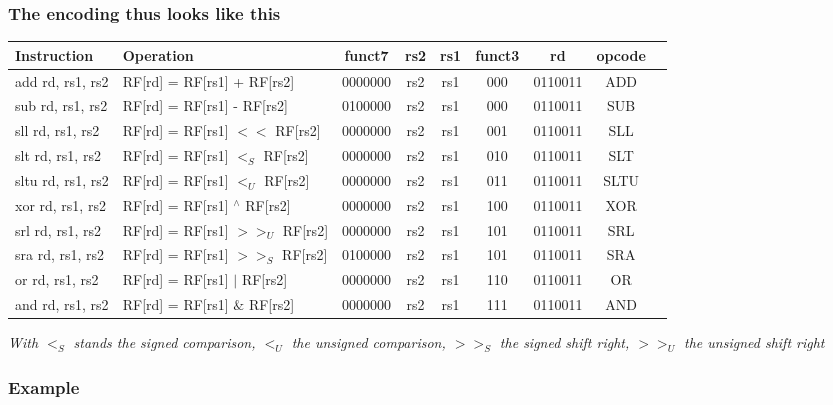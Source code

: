 \documentclass[12pt,openany]{book}
\begin{document}
\subsubsection{The encoding thus looks like this}


	\begin{tabular}{|l|l|c|c|c|c|c|c|c|}
        \hline
		\textbf{Instruction} & \textbf{Operation} & \textbf{funct7} & \textbf{rs2} & \textbf{rs1} & \textbf{funct3} & \textbf{rd} & \textbf{opcode}  \\
        \hline
        add   rd, rs1, rs2  & RF[rd] = RF[rs1] + RF[rs2]            & 0000000 & rs2 & rs1 & 000  & 0110011 & ADD       \\
        sub   rd, rs1, rs2  & RF[rd] = RF[rs1] - RF[rs2]            & 0100000 & rs2 & rs1 & 000  & 0110011 & SUB       \\
        sll   rd, rs1, rs2  & RF[rd] = RF[rs1] $<<$ RF[rs2]         & 0000000 & rs2 & rs1 & 001  & 0110011 & SLL          \\
        slt   rd, rs1, rs2  & RF[rd] = RF[rs1] $<_{S}$ RF[rs2]      & 0000000 & rs2 & rs1 & 010  & 0110011 & SLT             \\
        sltu rd, rs1, rs2   & RF[rd] = RF[rs1] $<_{U}$ RF[rs2]      & 0000000 & rs2 & rs1 & 011  & 0110011 & SLTU            \\
        xor   rd, rs1, rs2  & RF[rd] = RF[rs1] $^{\wedge}$ RF[rs2]  & 0000000 & rs2 & rs1 & 100  & 0110011 & XOR                 \\
        srl   rd, rs1, rs2  & RF[rd] = RF[rs1] $>>_{U}$ RF[rs2]     & 0000000 & rs2 & rs1 & 101  & 0110011 & SRL              \\
        sra   rd, rs1, rs2  & RF[rd] = RF[rs1] $>>_{S}$ RF[rs2]     & 0100000 & rs2 & rs1 & 101  & 0110011 & SRA              \\
        or     rd, rs1, rs2 & RF[rd] = RF[rs1] $|$ RF[rs2]          & 0000000 & rs2 & rs1 & 110  & 0110011 & OR         \\
        and   rd, rs1, rs2  & RF[rd] = RF[rs1] $\&$ RF[rs2]         & 0000000 & rs2 & rs1 & 111  & 0110011 & AND          \\
        \hline
    \end{tabular}

	\textit{
		With $<_{S}$ stands the signed comparison,
		$<_{U}$ the unsigned comparison,
		$>>_{S}$ the signed shift right,
		$>>_{U}$ the unsigned shift right
		}
\subsubsection{Example}
\end{document}
